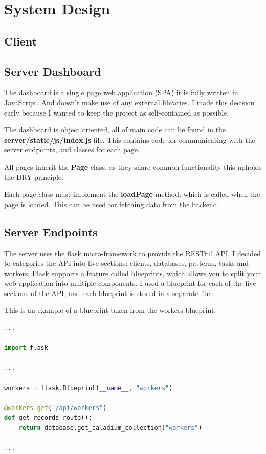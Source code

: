 \chapter{System Design}

\section{Client}


\section{Server Dashboard}
The dashboard is a single page web application (SPA) it is fully written in JavaScript.
And doesn't make use of any external libraries.
I made this decision early because I wanted to keep the project as self-contained as possible.

The dashboard is object oriented, all of main code can be found in the \textbf{server/static/js/index.js} file.
This contains code for communicating with the server endpoints, and classes for each page.

All pages inherit the \textbf{Page} class, as they share common functionality this upholds the DRY principle.


Each page class must implement the \textbf{loadPage} method, which is called when the page is loaded.
This can be used for fetching data from the backend.



\section{Server Endpoints}
The server uses the flask micro-framework to provide the RESTful API.
I decided to categories the API into five sections: clients, databases, patterns, tasks and workers.
Flask supports a feature called blueprints, which allows you to split your web application into multiple components.
I used a blueprint for each of the five sections of the API, and each blueprint is stored in a separate file.

This is an example of a blueprint taken from the workers blueprint.
\begin{lstlisting}[language=python]
...

import flask

...

workers = flask.Blueprint(__name__, "workers")

@workers.get("/api/workers")
def get_records_route():
    return database.get_caladium_collection("workers")

...
\end{lstlisting}

